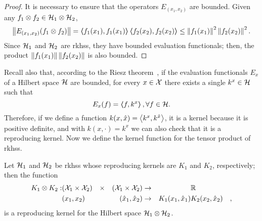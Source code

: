 \begin{proof}
    It is necessary to ensure that the operators $E_{(x_1, x_2)}$ are bounded. Given any $f_1 \otimes f_2 \in \mathcal{H}_1 \otimes \mathcal{H}_2$,
    $$ \left\lVert E_{(x_1, x_2)} (f_1 \otimes f_2)\right\rVert = \bm{\left\langle} f_1(x_1), f_1(x_1) \bm{\right\rangle} \bm{\left\langle} f_2(x_2), f_2(x_2) \bm{\right\rangle} \leq \left\lVert f_1(x_1)\right\rVert^2  \left\lVert f_2(x_2)\right\rVert^2 .$$
    Since $\mathcal{H}_1$ and $\mathcal{H}_2$ are \acrshort{rkhss}, they have bounded evaluation functionals; then, the product
    $ \left\lVert f_1(x_1)\right\rVert  \left\lVert f_2(x_2)\right\rVert $
    is also bounded.
\end{proof}
%
Recall also that, according to the Riesz theorem~\cite{Whittaker1991ACI}, if the evaluation functionals $E_x$ of a Hilbert space $\mathcal{H}$ are bounded, for every $x \in \mathcal{X}$ there exists a single $k^x \in \mathcal{H}$ such that 
$$ E_x(f) = \bm{\left\langle} f, k^x \bm{\right\rangle}, \forall f \in \mathcal{H} .$$
Therefore, if we define a function $k(x, \hat{x}) = \bm{\left\langle} k^x, k^{\hat{x}} \bm{\right\rangle}$, it is a kernel because it is positive definite, and with $k(x, \cdot) = k^x$ we can also check that it is a reproducing kernel.
%
Now we define the kernel function for the tensor product of \acrshort{rkhss}.
\begin{proposition}
    Let $\mathcal{H}_1$ and $\mathcal{H}_2$ be \acrshort{rkhss} whose reproducing kernels are $K_1$ and $K_2$, respectively;
    then the function
    \begin{equation}
        \nonumber
        \begin{aligned}
            K_1 \otimes K_2: & (\mathcal{X}_1 \times \mathcal{X}_2) & \times &  & (\mathcal{X}_1 \times \mathcal{X}_2) & \to &                     & \mathbb{R}              &   \\
                             & (x_1 , x_2)                  &        &  & (\hat{x}_1 , \hat{x}_2)      & \to & K_1(x_1, \hat{x}_1) & K_2(x_2, \hat{x}_2) & ,
        \end{aligned}
    \end{equation}
    is a reproducing kernel for the Hilbert space $\mathcal{H}_1 \otimes \mathcal{H}_2$.
\end{proposition}
